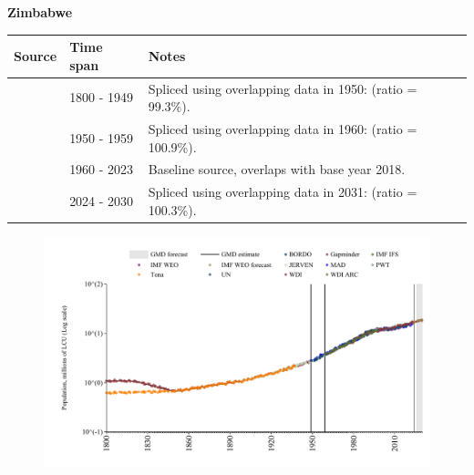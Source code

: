 \documentclass[12pt,a4paper,landscape]{article}
\begin{document}
\begin{adjustbox}{max totalsize={\paperwidth}{\paperheight},center}
\begin{minipage}[t][\textheight][t]{\textwidth}
\vspace*{0.5cm}
{}
\begin{center}
{\Large\bfseries Zimbabwe}
\end{center}
\vspace{0.5cm}
\begin{table}[H]
\centering
\small
\begin{tabular}{|l|l|l|}
\hline
\textbf{Source} & \textbf{Time span} & \textbf{Notes} \\
\hline
\rowcolor{white}\cite{Gapminder}& 1800 - 1949 &Spliced using overlapping data in 1950: (ratio = 99.3\%).\\
\rowcolor{lightgray}\cite{IMF_IFS}& 1950 - 1959 &Spliced using overlapping data in 1960: (ratio = 100.9\%).\\
\rowcolor{white}\cite{WDI}& 1960 - 2023 &Baseline source, overlaps with base year 2018.\\
\rowcolor{lightgray}\cite{Gapminder}& 2024 - 2030 &Spliced using overlapping data in 2031: (ratio = 100.3\%).\\
\hline
\end{tabular}
\end{table}
\begin{figure}[H]
\centering
\includegraphics[width=\textwidth,height=0.6\textheight,keepaspectratio]{graphs/ZWE_pop.pdf}
\end{figure}
\end{minipage}
\end{adjustbox}
\end{document}
